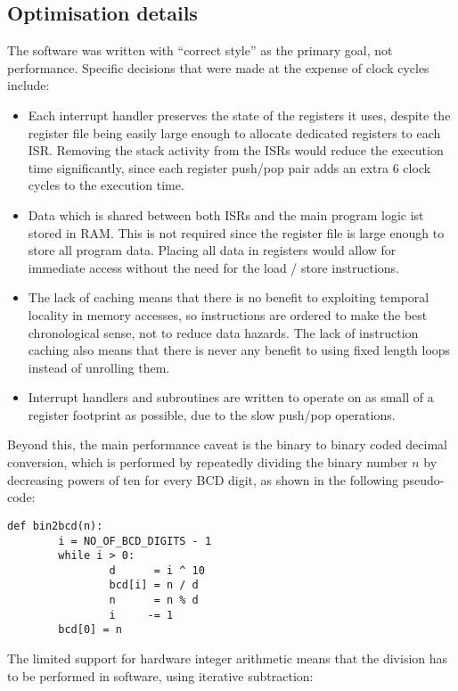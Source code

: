 \documentclass[12pt,a4paper]{article}
\begin{document}
\subsection{Optimisation details}

The software was written with ``correct style'' as the primary goal,
not performance. Specific decisions that were made at the expense of
clock cycles include:

\begin{itemize}
\item Each interrupt handler preserves the state of the registers it
  uses, despite the register file being easily large enough to
  allocate dedicated registers to each ISR. Removing the stack
  activity from the ISRs would reduce the execution time
  significantly, since each register push/pop pair adds an extra 6
  clock cycles to the execution time.
\item Data which is shared between both ISRs and the main program
  logic ist stored in RAM. This is not required since the register
  file is large enough to store all program data. Placing all data in
  registers would allow for immediate access without the need for the
  load / store instructions.
\item The lack of caching means that there is no benefit to exploiting
  temporal locality in memory accesses, so instructions are ordered to
  make the best chronological sense, not to reduce data hazards. The
  lack of instruction caching also means that there is never any
  benefit to using fixed length loops instead of unrolling them.
\item Interrupt handlers and subroutines are written to operate on as
  small of a register footprint as possible, due to the slow push/pop
  operations.
\end{itemize}

Beyond this, the main performance caveat is the binary to binary coded
decimal conversion, which is performed by repeatedly dividing the
binary number $n$ by decreasing powers of ten for every BCD digit, as
shown in the following pseudo-code:

\begin{verbatim}
def bin2bcd(n):
        i = NO_OF_BCD_DIGITS - 1
        while i > 0:
                d      = i ^ 10
                bcd[i] = n / d
                n      = n % d
                i     -= 1
        bcd[0] = n
\end{verbatim}

The limited support for hardware integer arithmetic means that the
division has to be performed in software, using iterative subtraction:
\end{document}
